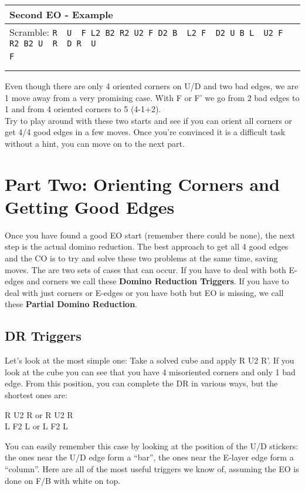 \documentclass[11pt,a4paper]{book}
\newcommand{\p}{\textquotesingle}
\newcommand{\m}{\texttt}
\newcommand{\ps}{\p\,\,}
\newcommand{\comment}[1]{{\color{gray}\quad//#1}}
\begin{document}
\bigskip
\begin{tabular}{|l|}
\hline
\textbf{Second EO - Example }\\
\hline
Scramble: \m{R\ps U\ps F L2 B2 R2 U2 F D2 B\ps L2 F\ps D2 U B L\ps U2 F\ps R2 B2 U\ps R\ps D R\ps U\p}\\ \m{F}\\
\hline
\begin{minipage}[l]{0.650\textwidth}
\bigskip
 \m{B\ps R\ps D\ps L\ps \comment{ EO (R/L) (4/4) }}\\
\bigskip
\bigskip
\bigskip
\bigskip
\bigskip
\end{minipage}
\begin{minipage}[c]{0.25\textwidth}
\centering
\def\svgwidth{\columnwidth}

\end{minipage}\\
\hline
\end{tabular}
\bigskip
\newline
Even though there are only 4 oriented corners on U/D and two bad edges, we are 1 move away from a very promising case. 
With F or F’ we go from 2 bad edges to 1 and from 4 oriented corners to 5 (4-1+2).\\
Try to play around with these two starts and see if you can orient all corners or get 4/4 good edges in a few moves. Once you’re convinced it is a difficult task without a hint, you can move on to the next part.

\chapter{Part Two: Orienting Corners and Getting Good Edges}

Once you have found a good EO start (remember there could be none), the next step is the actual domino reduction.  
The best approach to get all 4 good edges and the CO is to try and solve these two problems at the same time, saving moves.
The are two sets of cases that can occur. If you have to deal with both E-edges and corners we call these\textbf{ Domino Reduction Triggers}. If you have to deal with just corners or E-edges or you have both but EO is missing, we call these \textbf{Partial Domino Reduction}.

\section{DR Triggers}

Let’s look at the most simple one:
Take a solved cube and apply R U2 R’. 
If you look at the cube you can see that you have 4 misoriented corners and only 1 bad edge. From this position, you can complete the DR in various ways, but the shortest ones are:
\bigskip
\begin{center}
R U2  R or R U2  R\p \\
L F2  L  or L F2  L\p
\end{center}
\bigskip
You can easily remember this case by looking at the position of the U/D stickers: the ones near the U/D edge form a “bar”, the ones near the E-layer edge form a “column”.
Here are all of the most useful triggers we know of, assuming the EO is done on F/B with white on top.\\
\end{document}
